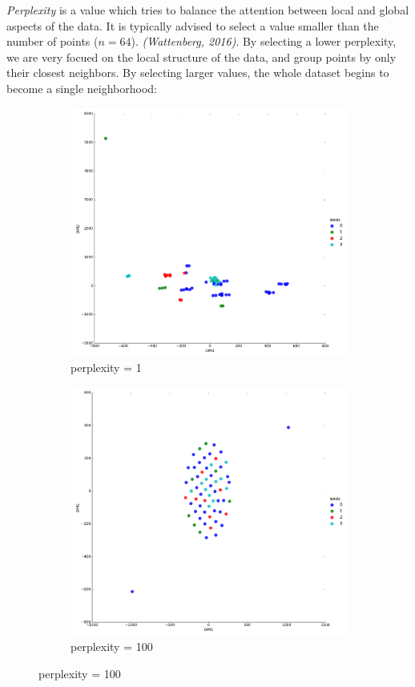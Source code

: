 \documentclass[20pt]{article} %
\begin{document}
\newpage
\textit{Perplexity} is a value which tries to balance the attention between local and global aspects of the data.  It is typically advised to select a value smaller than the number of points  ($n=64$). \textit{(Wattenberg, 2016)}.  By selecting a lower perplexity, we are very focued on the local structure of the data, and group points by only their closest neighbors.  By selecting larger values, the whole dataset begins to become a single neighborhood:
\begin{figure}[!htbp]
  	\centering
   	\begin{subfigure}[p]{0.45\linewidth}
    	\includegraphics[width=\linewidth]{./figures/lowp.png}
	\caption{perplexity = 1}
   	\end{subfigure}
  	\centering
   	\begin{subfigure}[p]{0.45\linewidth}
    	\includegraphics[width=\linewidth]{./figures/highp.png}
	\caption{perplexity = 100}
   	\end{subfigure}
\end{figure}
\end{document}

